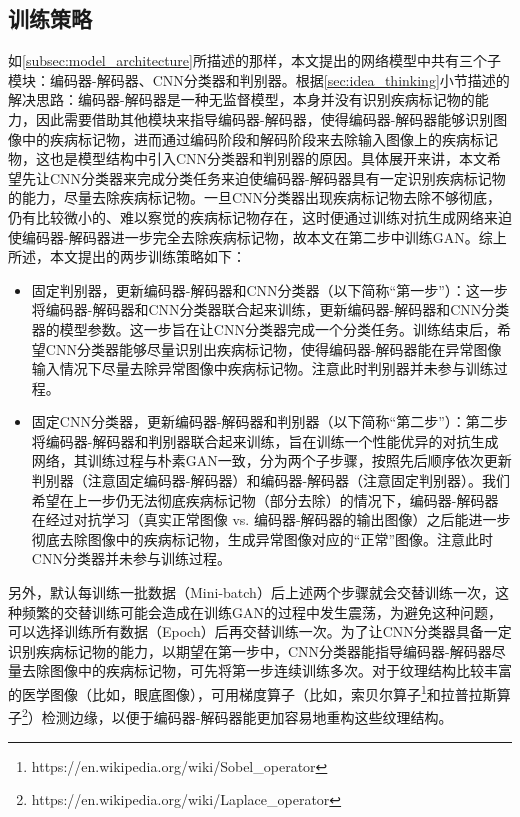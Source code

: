 \subsection{训练策略}\label{subsec:traing_stragies}
如\ref{subsec:model_architecture}所描述的那样，本文提出的网络模型中共有三个子模块：编码器-解码器、CNN分类器和判别器。根据\ref{sec:idea_thinking}小节描述的解决思路：编码器-解码器是一种无监督模型，本身并没有识别疾病标记物的能力，因此需要借助其他模块来指导编码器-解码器，使得编码器-解码器能够识别图像中的疾病标记物，进而通过编码阶段和解码阶段来去除输入图像上的疾病标记物，这也是模型结构中引入CNN分类器和判别器的原因。具体展开来讲，本文希望先让CNN分类器来完成分类任务来迫使编码器-解码器具有一定识别疾病标记物的能力，尽量去除疾病标记物。一旦CNN分类器出现疾病标记物去除不够彻底，仍有比较微小的、难以察觉的疾病标记物存在，这时便通过训练对抗生成网络来迫使编码器-解码器进一步完全去除疾病标记物，故本文在第二步中训练GAN。综上所述，本文提出的两步训练策略如下：
\begin{itemize}\label{item:training_steps}
	\item 固定判别器，更新编码器-解码器和CNN分类器（以下简称“第一步”）：这一步将编码器-解码器和CNN分类器联合起来训练，更新编码器-解码器和CNN分类器的模型参数。这一步旨在让CNN分类器完成一个分类任务。训练结束后，希望CNN分类器能够尽量识别出疾病标记物，使得编码器-解码器能在异常图像输入情况下尽量去除异常图像中疾病标记物。注意此时判别器并未参与训练过程。
	\item 固定CNN分类器，更新编码器-解码器和判别器（以下简称“第二步”）：第二步将编码器-解码器和判别器联合起来训练，旨在训练一个性能优异的对抗生成网络，其训练过程与朴素GAN一致，分为两个子步骤，按照先后顺序依次更新判别器（注意固定编码器-解码器）和编码器-解码器（注意固定判别器）。我们希望在上一步仍无法彻底疾病标记物（部分去除）的情况下，编码器-解码器在经过对抗学习（真实正常图像 vs. 编码器-解码器的输出图像）之后能进一步彻底去除图像中的疾病标记物，生成异常图像对应的“正常”图像。注意此时CNN分类器并未参与训练过程。
\end{itemize}
另外，默认每训练一批数据（Mini-batch）后上述两个步骤就会交替训练一次，这种频繁的交替训练可能会造成在训练GAN的过程中发生震荡，为避免这种问题，可以选择训练所有数据（Epoch）后再交替训练一次。为了让CNN分类器具备一定识别疾病标记物的能力，以期望在第一步中，CNN分类器能指导编码器-解码器尽量去除图像中的疾病标记物，可先将第一步连续训练多次。对于纹理结构比较丰富的医学图像（比如，眼底图像），可用梯度算子（比如，索贝尔算子\footnote{https://en.wikipedia.org/wiki/Sobel\_operator}和拉普拉斯算子\footnote{https://en.wikipedia.org/wiki/Laplace\_operator}）检测边缘，以便于编码器-解码器能更加容易地重构这些纹理结构。


